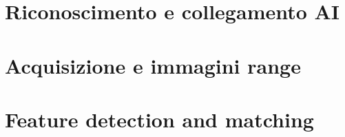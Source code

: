 \section{Riconoscimento e collegamento AI}

%

\section{Acquisizione e immagini range}

%

\section{Feature detection and matching}